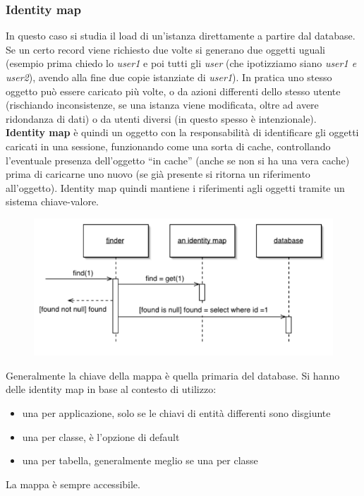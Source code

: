 \subsubsection{Identity map}
In questo caso si studia il load di un'istanza direttamente a partire dal database. Se un certo record viene richiesto due volte si generano due oggetti uguali (esempio prima chiedo lo \textit{user1} e poi tutti gli \textit{user} (che ipotizziamo siano \textit{user1 \textnormal{e} user2}), avendo alla fine due copie istanziate di \textit{user1}). In pratica uno stesso oggetto può essere caricato più volte, o da azioni differenti dello stesso utente (rischiando inconsistenze, se una istanza viene modificata, oltre ad avere ridondanza di dati) o da utenti diversi (in questo spesso è intenzionale).\\ \textbf{Identity map} è quindi un oggetto con la responsabilità di identificare gli oggetti caricati in una sessione, funzionando come una sorta di cache, controllando l'eventuale presenza dell'oggetto ``in cache'' (anche se non si ha una vera cache) prima di caricarne uno nuovo (se già presente si ritorna un riferimento all'oggetto). Identity map quindi mantiene i riferimenti agli oggetti tramite un sistema chiave-valore.\\
\begin{figure}[H]
        \centering
        \includegraphics[scale = 0.5]{Imm/i-map.PNG}
    \end{figure}
Generalmente la chiave della mappa è quella primaria del database. Si hanno delle identity map in base al contesto di utilizzo:
\begin{itemize}
  \item una per applicazione, solo se le chiavi di entità differenti sono disgiunte
  \item una per classe, è l'opzione di default
  \item una per tabella, generalmente meglio se una per classe
\end{itemize}
La mappa è sempre accessibile.\\
